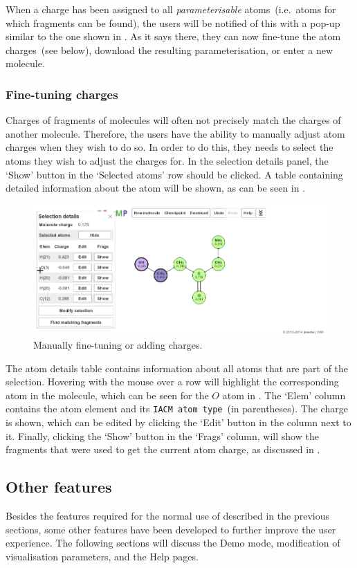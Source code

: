 When a charge has been assigned to all \emph{parameterisable} atoms~(i.e.\ atoms for which fragments can be found), the users will be notified of this with a pop-up similar to the one shown in . As it says there, they can now fine-tune the atom charges~(see below), download the resulting parameterisation, or enter a new molecule.

\subsubsection{Fine-tuning charges}
Charges of fragments of molecules will often not precisely match the charges of another molecule. Therefore, the users have the ability to manually adjust atom charges when they wish to do so. In order to do this, they needs to select the atoms they wish to adjust the charges for. In the selection details panel, the `Show' button in the `Selected atoms' row should be clicked. A table containing detailed information about the atom will be shown, as can be seen in .

\begin{figure}
\center
\includegraphics[width=.9\textwidth]{img/editing.png}
\caption{Manually fine-tuning or adding charges.}
\end{figure}

The atom details table contains information about all atoms that are part of the selection. Hovering with the mouse over a row will highlight the corresponding atom in the molecule, which can be seen for the $O$ atom in . The `Elem' column contains the atom element and its \verb|IACM atom type|~(in parentheses). The charge is shown, which can be edited by clicking the `Edit' button in the column next to it. Finally, clicking the `Show' button in the `Frags' column, will show the fragments that were used to get the current atom charge, as discussed in .


\subsection{Other features}
Besides the features required for the normal use of \oframp{} described in the previous sections, some other features have been developed to further improve the user experience. The following sections will discuss the Demo mode, modification of visualisation parameters, and the \oframp{} Help pages.

